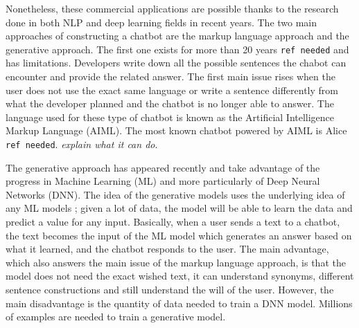 Nonetheless, these commercial applications are possible thanks to the research done in both NLP and deep learning fields in recent years. The two main approaches of constructing a chatbot are the markup language approach and the generative approach. The first one exists for more than 20 years \texttt{ref needed} and has limitations. Developers write down all the possible sentences the chabot can encounter and provide the related answer. The first main issue rises when the user does not use the exact same language or write a sentence differently from what the developer planned and the chatbot is no longer able to answer. The language used for these type of chatbot is known as the Artificial Intelligence Markup Language (AIML). The most known chatbot powered by AIML is Alice \texttt{ref needed}. \textit{explain what it can do}.

The generative approach has appeared recently and take advantage of the progress in Machine Learning (ML) and more particularly of Deep Neural Networks (DNN). The idea of the generative models uses the underlying idea of any ML models ; given a lot of data, the model will be able to learn the data and predict a value for any input. Basically, when a user sends a text to a chatbot, the text becomes the input of the ML model which generates an answer based on what it learned, and the chatbot responds to the user. The main advantage, which also answers the main issue of the markup language approach, is that the model does not need the exact wished text, it can understand synonyms, different sentence constructions and still understand the will of the user. However, the main disadvantage is the quantity of data needed to train a DNN model. Millions of examples are needed to train a generative model.
